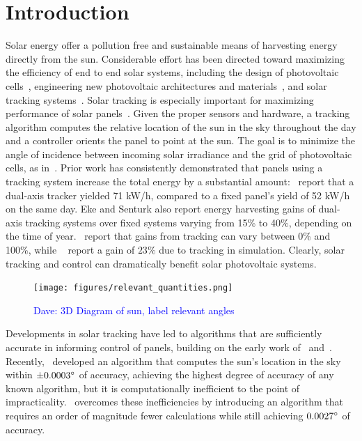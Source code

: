 \documentclass{article}
\newcommand{\dnote}[1]{\textcolor{blue}{Dave: #1}}
\begin{document}
\section{Introduction}
Solar energy offer a pollution free and sustainable means of harvesting energy directly from the sun. Considerable effort has been directed toward maximizing the efficiency of end to end solar systems, including the design of photovoltaic cells~\cite{Jervase2001,li2012molecular}, engineering new photovoltaic architectures and materials~\cite{li2005high}, and solar tracking systems~\cite{camacho2012control}. Solar tracking is especially important for maximizing performance of solar panels~\cite{Eke2012,Rizk2008,King2001}. Given the proper sensors and hardware, a tracking algorithm computes the relative location of the sun in the sky throughout the day and a controller orients the panel to point at the sun. The goal is to minimize the angle of incidence between incoming solar irradiance and the grid of photovoltaic cells, as in~\citet{Eke2012,Benghanem2011,King2001, kalogirou1996design}. Prior work has consistently demonstrated that panels using a tracking system increase the total energy by a substantial amount:~\citet{Eke2012} report that a dual-axis tracker yielded 71 kW/h, compared to a fixed panel's yield of 52 kW/h on the same day. Eke and Senturk also report energy harvesting gains of dual-axis tracking systems over fixed systems varying from 15\% to 40\%, depending on the time of year.~\citet{mousazadeh2009review} report that gains from tracking can vary between 0\% and 100\%, while ~\citet{clifford2004design} report a gain of $23\%$ due to tracking in simulation. Clearly, solar tracking and control can dramatically benefit solar photovoltaic systems.

\begin{figure}[t]
\begin{center}
\texttt{[image: figures/relevant\_quantities.png]}
\caption{\dnote{3D Diagram of sun, label relevant angles}}
\end{center}
\end{figure}

Developments in solar tracking have led to algorithms that are sufficiently accurate in informing control of panels, building on the early work of~\citet{spencer1971fourier,walraven1978calculating} and~\citet{michalsky1988astronomical}. Recently,~\citet{reda2004solar} developed an algorithm that computes the sun's location in the sky within $\pm 0.0003\degree$ of accuracy, achieving the highest degree of accuracy of any known algorithm, but it is computationally inefficient to the point of impracticality.~\citet{Grena2008} overcomes these inefficiencies by introducing an algorithm that requires an order of magnitude fewer calculations while still achieving $0.0027\degree$ of accuracy.
\end{document}
